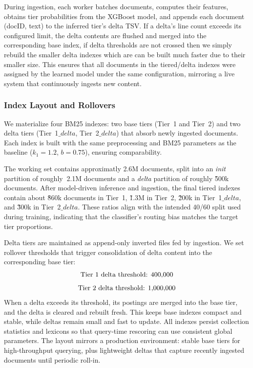 \documentclass[11pt]{article}
\begin{document}
During ingestion, each worker batches documents, computes their features, obtains tier probabilities from the XGBoost model, and appends each document (docID, text) to the inferred tier’s delta TSV. If a delta’s line count exceeds its configured limit, the delta contents are flushed and merged into the corresponding base index, if delta thresholds are not crossed then we simply rebuild the smaller delta indexes which are can be built much faster due to their smaller size. This ensures that all documents in the tiered/delta indexes were assigned by the learned model under the same configuration, mirroring a live system that continuously ingests new content.

\subsubsection{Index Layout and Rollovers}
We materialize four BM25 indexes: two base tiers (Tier~1 and Tier~2) and two delta tiers (Tier~1$\_delta$, Tier~2$\_delta$) that absorb newly ingested documents. Each index is built with the same preprocessing and BM25 parameters as the baseline ($k_1 = 1.2$, $b = 0.75$), ensuring comparability.

The working set contains approximatly 2.6M documents, split into an \emph{init} partition of roughly $~$2.1M documents and a \emph{delta} partition of roughly \~500k documents. After model-driven inference and ingestion, the final tiered indexes contain about \~860k documents in Tier~1, \~1.3M in Tier~2, \~200k in Tier~1$\_delta$, and \~300k in Tier~2$\_delta$. These ratios align with the intended 40/60 split used during training, indicating that the classifier’s routing bias matches the target tier proportions.

Delta tiers are maintained as append-only inverted files fed by ingestion. We set rollover thresholds that trigger consolidation of delta content into the corresponding base tier:
\[
\text{Tier 1 delta threshold: }400{,}000 \\
\]
\[
\text{Tier 2 delta threshold: }1{,}000{,}000 \\
\]
When a delta exceeds its threshold, its postings are merged into the base tier, and the delta is cleared and rebuilt fresh. This keeps base indexes compact and stable, while deltas remain small and fast to update. All indexes persist collection statistics and lexicons so that query-time rescoring can use consistent global parameters. The layout mirrors a production environment: stable base tiers for high-throughput querying, plus lightweight deltas that capture recently ingested documents until periodic roll-in.
\end{document}

